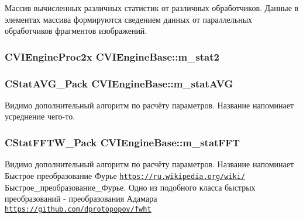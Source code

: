 Массив вычисленных различных статистик от различных обработчиков. Данные в элементах массива формируются сведением данных от параллельных обработчиков фрагментов изображений. 

\hypertarget{class_c_v_i_engine_base_a91282745c78c776f8922e20c4f3198f5}{
\subsubsection[{m\+\_\+stat2}]{\setlength{\rightskip}{0pt plus 5cm}C\+V\+I\+Engine\+Proc2x C\+V\+I\+Engine\+Base\+::m\+\_\+stat2}}\label{class_c_v_i_engine_base_a91282745c78c776f8922e20c4f3198f5}




\hypertarget{class_c_v_i_engine_base_aad8ff35fe2bc6a8d6da03b8f93ea3341}{
\subsubsection[{m\+\_\+stat\+A\+V\+G}]{\setlength{\rightskip}{0pt plus 5cm}C\+Stat\+A\+V\+G\+\_\+\+Pack C\+V\+I\+Engine\+Base\+::m\+\_\+stat\+A\+V\+G}}\label{class_c_v_i_engine_base_aad8ff35fe2bc6a8d6da03b8f93ea3341}


Видимо дополнительный алгоритм по расчёту параметров. Название напоминает усреднение чего-\/то. 

\hypertarget{class_c_v_i_engine_base_a475ef6e1419c21ec5d68097a4cd822ee}{
\subsubsection[{m\+\_\+stat\+F\+F\+T}]{\setlength{\rightskip}{0pt plus 5cm}C\+Stat\+F\+F\+T\+W\+\_\+\+Pack C\+V\+I\+Engine\+Base\+::m\+\_\+stat\+F\+F\+T}}\label{class_c_v_i_engine_base_a475ef6e1419c21ec5d68097a4cd822ee}


Видимо дополнительный алгоритм по расчёту параметров. Название напоминает Быстрое преобразование Фурье \href{https://ru.wikipedia.org/wiki/}{\tt https\+://ru.\+wikipedia.\+org/wiki/}Быстрое\+\_\+преобразование\+\_\+Фурье. Одно из подобного класса быстрых преобразований -\/ преобразования Адамара \href{https://github.com/dprotopopov/fwht}{\tt https\+://github.\+com/dprotopopov/fwht} 

